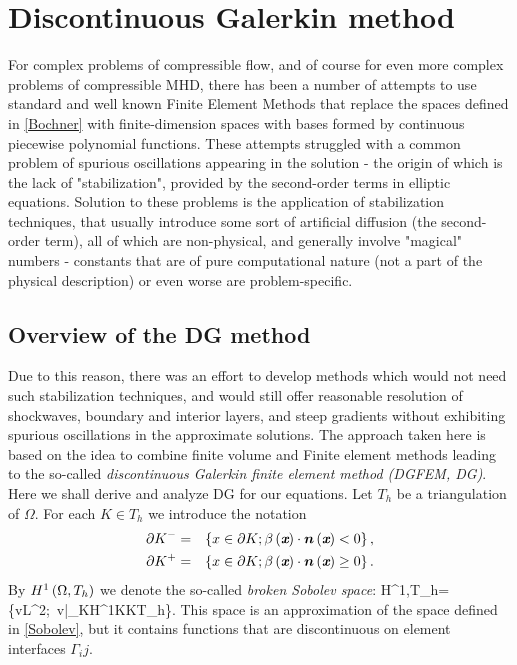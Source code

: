 \section{Discontinuous Galerkin method}

For complex problems of compressible flow, and of course for even more complex problems of compressible MHD, there has been a number of attempts to use standard and well known Finite Element Methods that replace the spaces defined in \ref{Bochner} with finite-dimension spaces with bases formed by continuous piecewise polynomial functions. These attempts struggled with a common problem of spurious oscillations appearing in the solution - the origin of which is the lack of "stabilization", provided by the second-order terms in elliptic equations. Solution to these problems is the application of stabilization techniques, that usually introduce some sort of artificial diffusion (the second-order term), all of which are non-physical, and generally involve "magical" numbers - constants that are of pure computational nature (not a part of the physical description) or even worse are problem-specific.

\subsection{Overview of the DG method}
Due to this reason, there  was an effort to develop methods which would not need such stabilization techniques, and would still offer reasonable resolution of shockwaves, boundary and interior layers, and steep gradients without exhibiting spurious oscillations in the approximate solutions. The approach taken here is based on the idea to combine finite volume and Finite element methods leading to the so-called \emph{discontinuous Galerkin finite element method (DGFEM, DG)}. Here we shall derive and analyze DG for our equations. Let $T_h$ be a triangulation of $\Omega$. For each $K\in T_h$ we introduce the notation
\begin{eqnarray}
\partial K^- & = & \left\{x\in\partial K;\beta\left(\textit{\textbf{x}}\right)\cdot\mbox{\boldmath $n$}\left(\textit{\textbf{x}}\right) <0\right\},\\
\partial K^+ & = & \left\{x\in\partial K;\beta\left(\textit{\textbf{x}}\right)\cdot\mbox{\boldmath $n$}\left(\textit{\textbf{x}}\right) \geq 0\right\}.
\end{eqnarray}
By $H^1\left(\Omega, T_h\right)$ we denote the so-called \textit{broken Sobolev space}:
\be
\label{BrokenSobolev} H^1\lo\Omega,T_h\ro = \left\{v\in L^2\lo\Omega\ro;\ v|_K\in H^1\lo K\ro \forall K\in T_h\right\}.
\ee
This space is an approximation of the space defined in \ref{Sobolev}, but it contains functions that are discontinuous on element interfaces $\Gamma_ij$.
